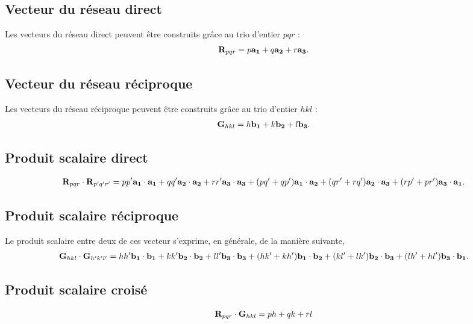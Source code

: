 \documentclass[11pt]{article}
\begin{document}
\subsection{Vecteur du réseau direct}

Les vecteurs du réseau direct peuvent être construits grâce au trio d'entier $pqr$ :
\begin{align*}
	\vb{R}_{pqr} = p \vb{a_1} + q \vb{a_2} + r \vb{a_3}.
\end{align*}

\subsection{Vecteur du réseau réciproque}

Les vecteurs du réseau réciproque peuvent être construits grâce au trio d'entier $hkl$ :
\begin{align*}
	\vb{G}_{hkl} = h \vb{b_1} + k \vb{b_2} + l \vb{b_3}.
\end{align*}



\subsection{Produit scalaire direct}
\begin{align*}
	\vb{R}_{pqr} \cdot \vb{R}_{p^\prime q^\prime r^\prime} = 
	pp^\prime \vb{a_1}\cdot\vb{a_1} + qq^\prime \vb{a_2}\cdot\vb{a_2} + rr^\prime \vb{a_3}\cdot\vb{a_3}
	+\pqty{pq^\prime + qp^\prime} \vb{a_1}\cdot\vb{a_2} + \pqty{qr^\prime + rq^\prime} \vb{a_2}\cdot\vb{a_3} + \pqty{rp^\prime + pr^\prime} \vb{a_3}\cdot\vb{a_1}.
\end{align*}

\subsection{Produit scalaire réciproque}
Le produit scalaire entre deux de ces vecteur s'exprime, en générale, de la manière suivante,
\begin{align*}
	\vb{G}_{hkl} \cdot \vb{G}_{h^\prime k^\prime l^\prime} = 
	hh^\prime \vb{b_1}\cdot\vb{b_1} + kk^\prime \vb{b_2}\cdot\vb{b_2} + ll^\prime \vb{b_3}\cdot\vb{b_3}
	+\pqty{hk^\prime + kh^\prime} \vb{b_1}\cdot\vb{b_2} + \pqty{kl^\prime + lk^\prime} \vb{b_2}\cdot\vb{b_3} + \pqty{lh^\prime + hl^\prime} \vb{b_3}\cdot\vb{b_1}.
\end{align*}

\subsection{Produit scalaire croisé}
\begin{align*}
	\vb{R}_{pqr} \cdot \vb{G}_{hkl} = ph + qk + rl
\end{align*}
\end{document}
